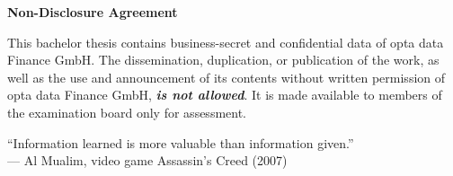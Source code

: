 \thispagestyle{empty} %

\begin{center}
    \Large\textbf{Non-Disclosure Agreement}
\end{center}
\noindent This bachelor thesis contains business-secret and confidential data of opta data Finance GmbH. The dissemination, duplication, or publication of the work, as well as the use and announcement of its contents without written permission of opta data Finance GmbH, \textbf{\textit{is not allowed}}. It is made available to members of the examination board only for assessment.\vspace{4cm}

                   \begin{center}
              \color{teal}
                        \large{“Information learned is more valuable than information given.”}\\
                      \color{black} 
                                                 {— Al Mualim, video game Assassin’s Creed (2007)}  
                   \end{center}